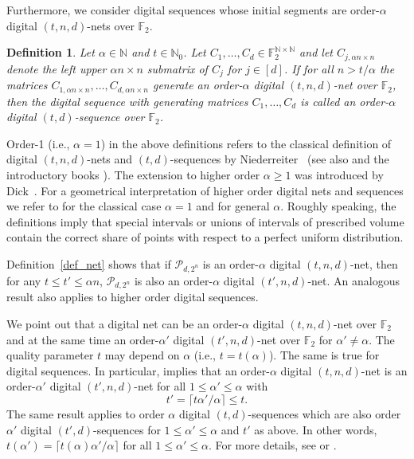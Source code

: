 \documentclass[12pt, a4paper]{article}
\newtheorem{defin}[thm]{Definition}
\def\P{\mathcal{P}}
\newcommand{\N}{{\mathbb{N}}} %
\begin{document}
Furthermore, we consider digital sequences whose initial segments are order-$\alpha$ digital $(t,n,d)$-nets over $\mathbb{F}_2$.

\begin{defin}\rm%
Let $\alpha \in \N$ and $t \in \N_0$. Let $C_1,\ldots, C_d \in \mathbb{F}_2^{\mathbb{N} \times \mathbb{N}}$ and let $C_{j, \alpha n \times n}$ denote the left upper $\alpha n \times n$ submatrix of  $C_j$ for $j\in [d]$. If for all $n > t/\alpha$ the matrices $C_{1, \alpha n \times n},\ldots, C_{d, \alpha n \times n}$ generate an order-$\alpha$ digital $(t,n,d)$-net over $\mathbb{F}_2$, then the digital sequence with generating matrices $C_1,\ldots, C_d$ is called an {order-$\alpha$ digital $(t,d)$-sequence over $\mathbb{F}_2$}.
\end{defin}

Order-1 (i.e., $\alpha=1$) in the above definitions refers to the classical definition of digital $(t,n,d)$-nets and $(t,d)$-sequences by Niederreiter~\cite{N87} (see also \cite{N92} and the introductory books \cite{DP10,LP14}). The extension to higher order $\alpha \ge 1$ was introduced by Dick~\cite{D07,D08}. For a geometrical interpretation of higher order digital nets and sequences we refer to \cite{N92,DP10,LP14} for the classical case $\alpha=1$ and \cite{DB09} for general $\alpha$. Roughly speaking, the definitions imply that special intervals or unions of intervals of prescribed volume contain the correct share of points with respect to a perfect uniform distribution.

Definition~\ref{def_net} shows that if $\P_{d, 2^n}$ is an order-$\alpha$ digital $(t,n,d)$-net, then for any $t \le t' \le \alpha n$, $\P_{d, 2^n}$ is also an order-$\alpha$ digital $(t',n,d)$-net. An analogous result also applies to higher order digital sequences.

We point out that a digital net can be an order-$\alpha$ digital $(t,n,d)$-net over $\mathbb{F}_2$ and at the same time an order-$\alpha'$ digital $(t',n,d)$-net over $\mathbb{F}_2$ for $\alpha'\not = \alpha$. The quality parameter $t$ may depend on $\alpha$ (i.e., $t=t(\alpha)$). The same is true for digital sequences. In particular, \cite[Theorem~4.10]{D08} implies that an order-$\alpha$ digital $(t,n,d)$-net is an order-$\alpha'$ digital $(t',n,d)$-net for all $1 \le \alpha' \le \alpha$ with 
\begin{equation*}%
t' = \lceil t \alpha'/\alpha \rceil \le t.
\end{equation*}
The same result applies to order $\alpha$ digital $(t,d)$-sequences which are also order $\alpha'$ digital $(t',d)$-sequences for $1 \le \alpha' \le \alpha$ and $t'$ as above. In other words, $t(\alpha') = \lceil t(\alpha) \alpha'/\alpha \rceil$ for all $1 \le \alpha' \le \alpha$. For more details, see \cite{D07,D08} or \cite[Chapter~15]{DP10}.
\end{document}

